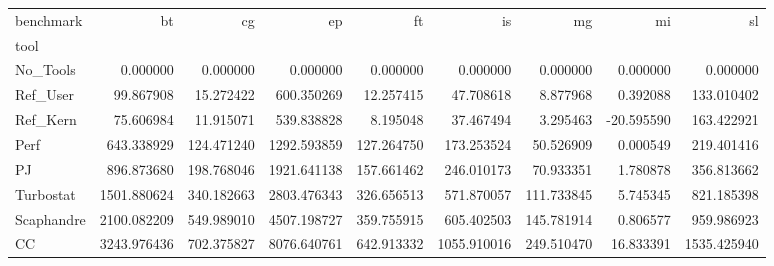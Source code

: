 \begin{tabular}{lrrrrrrrr}
\toprule
benchmark & bt & cg & ep & ft & is & mg & mi & sl \\
tool &  &  &  &  &  &  &  &  \\
\midrule
No_Tools & 0.000000 & 0.000000 & 0.000000 & 0.000000 & 0.000000 & 0.000000 & 0.000000 & 0.000000 \\
Ref_User & 99.867908 & 15.272422 & 600.350269 & 12.257415 & 47.708618 & 8.877968 & 0.392088 & 133.010402 \\
Ref_Kern & 75.606984 & 11.915071 & 539.838828 & 8.195048 & 37.467494 & 3.295463 & -20.595590 & 163.422921 \\
Perf & 643.338929 & 124.471240 & 1292.593859 & 127.264750 & 173.253524 & 50.526909 & 0.000549 & 219.401416 \\
PJ & 896.873680 & 198.768046 & 1921.641138 & 157.661462 & 246.010173 & 70.933351 & 1.780878 & 356.813662 \\
Turbostat & 1501.880624 & 340.182663 & 2803.476343 & 326.656513 & 571.870057 & 111.733845 & 5.745345 & 821.185398 \\
Scaphandre & 2100.082209 & 549.989010 & 4507.198727 & 359.755915 & 605.402503 & 145.781914 & 0.806577 & 959.986923 \\
CC & 3243.976436 & 702.375827 & 8076.640761 & 642.913332 & 1055.910016 & 249.510470 & 16.833391 & 1535.425940 \\
\bottomrule
\end{tabular}
